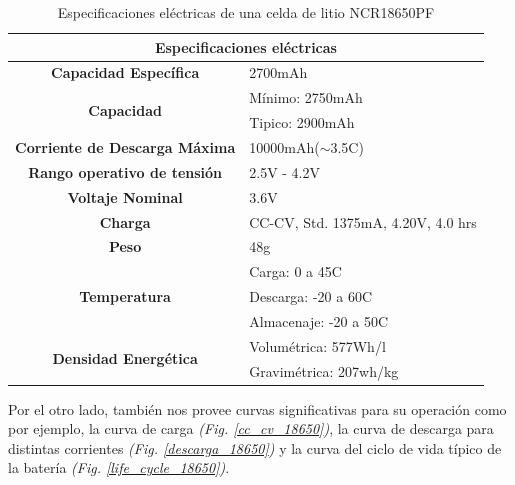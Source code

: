 \documentclass[10pt, a4paper]{report}
\begin{document}
\begin{table}[h]
    \begin{center}
	\begin{tabular}{|c|l|}
	    \hline
	    \multicolumn{2}{|c|}{Especificaciones el\'ectricas}                          \\ \hline
	    \textbf{Capacidad Específica}                 & 2700mAh                            \\ \hline
	    \multirow{2}{*}{\textbf{Capacidad}}           & Mínimo: 2750mAh                    \\ \cline{2-2} 
	    & Tipico: 2900mAh                    \\ \hline
	    \textbf{Corriente de Descarga Máxima}         & 10000mAh($\sim$3.5C)               \\ \hline
	    \textbf{Rango operativo de tensión}           & 2.5V - 4.2V                        \\ \hline
	    \textbf{Voltaje Nominal}                      & 3.6V                               \\ \hline
	    \textbf{Charga}                               & CC-CV, Std. 1375mA, 4.20V, 4.0 hrs \\ \hline
	    \textbf{Peso}                                 & 48g                              \\ \hline
	    \multirow{3}{*}{\textbf{Temperatura}}         & Carga: 0 a 45C                     \\ \cline{2-2} 
	    & Descarga: -20 a 60C                \\ \cline{2-2} 
	    & Almacenaje: -20 a 50C              \\ \hline
	    \multirow{2}{*}{\textbf{Densidad Energética}} & Volum\'etrica: 577Wh/l               \\ \cline{2-2} 
	    & Gravim\'etrica: 207wh/kg             \\ \hline
	\end{tabular}%
	\caption{Especificaciones el\'ectricas de una celda de litio NCR18650PF}
	\label{ncr18650pf_table}
    \end{center}
\end{table}

Por el otro lado, \cite{18650pf} también nos provee curvas significativas para su
operaci\'on como por ejemplo, la curva de carga \emph{(Fig. \ref{cc_cv_18650})}, 
la curva de descarga para distintas corrientes 
\emph{(Fig. \ref{descarga_18650})} y la curva del ciclo de vida típico de la 
batería \emph{(Fig. \ref{life_cycle_18650})}.
\end{document}
